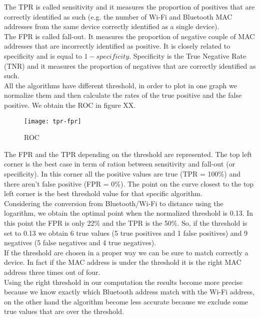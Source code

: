 The TPR is called sensitivity and it measures the proportion of positives that are correctly identified as such (e.g. the number of Wi-Fi and Bluetooth MAC addresses from the same device correctly identified as a single device).\\
The FPR is called fall-out. It measures the proportion of negative couple of MAC addresses that are incorrectly identified as positive. It is closely related to specificity and is equal to \(1-specificity\). Specificity is the True Negative Rate (TNR) and it measures the proportion of negatives that are correctly identified as such.\\
\linebreak
All the algorithms have different threshold, in order to plot in one graph we normalize them and then calculate the rates of the true positive and the false positive. We obtain the ROC in figure XX.
\begin{figure}[H]
\centering
\texttt{[image: tpr-fpr]}
\caption{ROC}
\end{figure}
The FPR and the TPR depending on the threshold are represented. The top left corner is the best case in term of ration between sensitivity and fall-out (or specificity). In this corner all the positive values are true (TPR = 100\%) and there aren't false positive (FPR = 0\%). The point on the curve closest to the top left corner is the best threshold value for that specific algorithm.\\
\linebreak
Considering the conversion from Bluetooth/Wi-Fi to distance using the logarithm, we obtain the optimal point when the normalized threshold is 0.13. In this point the FPR is only 22\% and the TPR is the 50\%. So, if the threshold is set to 0.13 we obtain 6 true values (5 true positives and 1 false positives) and 9 negatives (5 false negatives and 4 true negatives).\\
\linebreak
If the threshold are chosen in a proper way we can be sure to match correctly a device. In fact if the MAC address is under the threshold it is the right MAC address three times out of four.\\
Using the right threshold in our computation the results become more precise because we know exactly which Bluetooth address match with the Wi-Fi address, on the other hand the algorithm become less accurate because we exclude some true values that are over the threshold.

